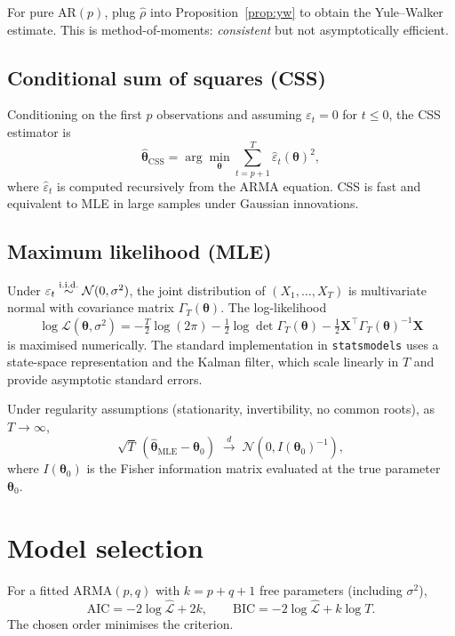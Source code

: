 For pure AR$(p)$, plug $\widehat\rho$ into
Proposition~\ref{prop:yw} to obtain the Yule--Walker estimate.
This is method-of-moments: \emph{consistent} but not asymptotically
efficient.

\subsection{Conditional sum of squares (CSS)}

Conditioning on the first $p$ observations and assuming
$\varepsilon_t = 0$ for $t \leq 0$, the CSS estimator is
\[
  \widehat{\bm\theta}_{\text{CSS}}
  = \arg\min_{\bm\theta} \sum_{t = p + 1}^{T}
        \widehat\varepsilon_t(\bm\theta)^2,
\]
where $\widehat\varepsilon_t$ is computed recursively from the
ARMA equation. CSS is fast and equivalent to MLE in large samples
under Gaussian innovations.

\subsection{Maximum likelihood (MLE)}

Under $\varepsilon_t \overset{\text{i.i.d.}}{\sim} \mathcal N(0, \sigma^2)$, the joint
distribution of $(X_1, \dots, X_T)$ is multivariate normal with
covariance matrix $\Gamma_T(\bm\theta)$. The log-likelihood
\[
  \log \mathcal L(\bm\theta, \sigma^2)
  = -\tfrac{T}{2}\log(2\pi)
    -\tfrac{1}{2}\log \det \Gamma_T(\bm\theta)
    -\tfrac{1}{2} \bm X^\top \Gamma_T(\bm\theta)^{-1} \bm X
\]
is maximised numerically. The standard implementation in
\texttt{statsmodels} uses a state-space representation and the
Kalman filter, which scale linearly in $T$ and provide asymptotic
standard errors.

\begin{thbox}
Under regularity assumptions (stationarity, invertibility, no
common roots), as $T \to \infty$,
\[
  \sqrt{T}\, (\widehat{\bm\theta}_{\text{MLE}} - \bm\theta_0)
  \;\xrightarrow{d}\; \mathcal N(0, I(\bm\theta_0)^{-1}),
\]
where $I(\bm\theta_0)$ is the Fisher information matrix evaluated
at the true parameter $\bm\theta_0$.
\end{thbox}

\section{Model selection}
\label{sec:selection}

\begin{defbox}
\label{def:aic-bic}
For a fitted ARMA$(p, q)$ with $k = p + q + 1$ free parameters
(including $\sigma^2$),
\[
  \mathrm{AIC} = -2 \log \widehat{\mathcal L} + 2 k,
  \qquad
  \mathrm{BIC} = -2 \log \widehat{\mathcal L} + k \log T.
\]
The chosen order minimises the criterion.
\end{defbox}

